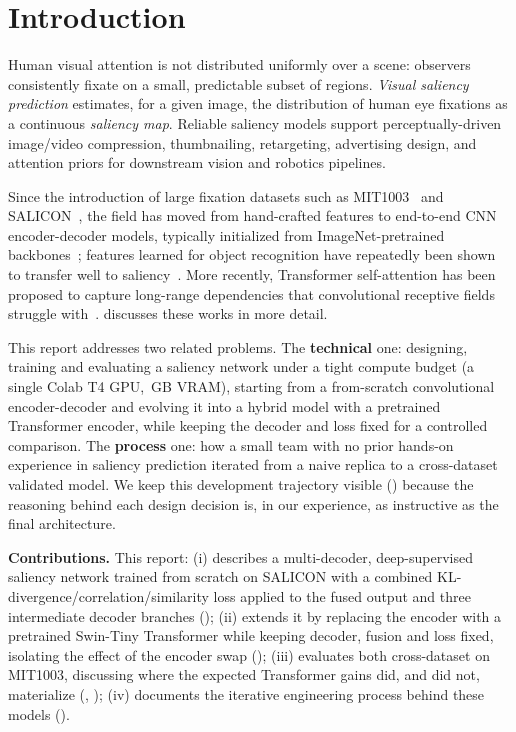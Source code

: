 
\section{Introduction}
\label{sec:introduction}

Human visual attention is not distributed uniformly over a scene: observers consistently fixate on a small, predictable subset of regions. \textit{Visual saliency prediction} estimates, for a given image, the distribution of human eye fixations as a continuous \textit{saliency map}. Reliable saliency models support perceptually-driven image/video compression, thumbnailing, retargeting, advertising design, and attention priors for downstream vision and robotics pipelines.

Since the introduction of large fixation datasets such as MIT1003~\cite{judd2009learning} and SALICON~\cite{jiang2015salicon}, the field has moved from hand-crafted features to end-to-end CNN encoder-decoder models, typically initialized from ImageNet-pretrained backbones~\cite{wang2018deep,ghariba2019visual}; features learned for object recognition have repeatedly been shown to transfer well to saliency~\cite{kummerer2016deepgaze}. More recently, Transformer self-attention has been proposed to capture long-range dependencies that convolutional receptive fields struggle with~\cite{lou2022transalnet}.  discusses these works in more detail.

This report addresses two related problems. The \textbf{technical} one: designing, training and evaluating a saliency network under a tight compute budget (a single Colab T4 GPU, \,GB VRAM), starting from a from-scratch convolutional encoder-decoder and evolving it into a hybrid model with a pretrained Transformer encoder, while keeping the decoder and loss fixed for a controlled comparison. The \textbf{process} one: how a small team with no prior hands-on experience in saliency prediction iterated from a naive replica to a cross-dataset validated model. We keep this development trajectory visible () because the reasoning behind each design decision is, in our experience, as instructive as the final architecture.

\noindent \textbf{Contributions.} This report: (i) describes a multi-decoder, deep-supervised saliency network trained from scratch on SALICON with a combined KL-divergence/correlation/similarity loss applied to the fused output and three intermediate decoder branches (); (ii) extends it by replacing the encoder with a pretrained Swin-Tiny Transformer while keeping decoder, fusion and loss fixed, isolating the effect of the encoder swap (); (iii) evaluates both cross-dataset on MIT1003, discussing where the expected Transformer gains did, and did not, materialize (, ); (iv) documents the iterative engineering process behind these models ().

